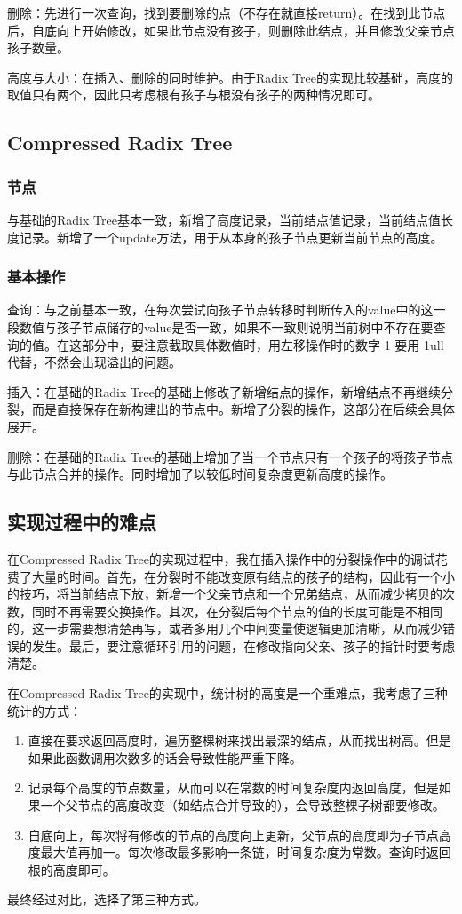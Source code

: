 \documentclass[fontset=windows]{article}
\begin{document}
删除：先进行一次查询，找到要删除的点（不存在就直接return）。在找到此节点后，自底向上开始修改，如果此节点没有孩子，则删除此结点，并且修改父亲节点孩子数量。

高度与大小：在插入、删除的同时维护。由于Radix Tree的实现比较基础，高度的取值只有两个，因此只考虑根有孩子与根没有孩子的两种情况即可。

\subsection{Compressed Radix Tree}

\subsubsection{节点}
与基础的Radix Tree基本一致，新增了高度记录，当前结点值记录，当前结点值长度记录。新增了一个update方法，用于从本身的孩子节点更新当前节点的高度。

\subsubsection{基本操作}
查询：与之前基本一致，在每次尝试向孩子节点转移时判断传入的value中的这一段数值与孩子节点储存的value是否一致，如果不一致则说明当前树中不存在要查询的值。在这部分中，要注意截取具体数值时，用左移操作时的数字 1 要用 1ull 代替，不然会出现溢出的问题。

插入：在基础的Radix Tree的基础上修改了新增结点的操作，新增结点不再继续分裂，而是直接保存在新构建出的节点中。新增了分裂的操作，这部分在后续会具体展开。

删除：在基础的Radix Tree的基础上增加了当一个节点只有一个孩子的将孩子节点与此节点合并的操作。同时增加了以较低时间复杂度更新高度的操作。

\subsection{实现过程中的难点}
在Compressed Radix Tree的实现过程中，我在插入操作中的分裂操作中的调试花费了大量的时间。首先，在分裂时不能改变原有结点的孩子的结构，因此有一个小的技巧，将当前结点下放，新增一个父亲节点和一个兄弟结点，从而减少拷贝的次数，同时不再需要交换操作。其次，在分裂后每个节点的值的长度可能是不相同的，这一步需要想清楚再写，或者多用几个中间变量使逻辑更加清晰，从而减少错误的发生。最后，要注意循环引用的问题，在修改指向父亲、孩子的指针时要考虑清楚。

在Compressed Radix Tree的实现中，统计树的高度是一个重难点，我考虑了三种统计的方式：
\begin{enumerate}
  \item 直接在要求返回高度时，遍历整棵树来找出最深的结点，从而找出树高。但是如果此函数调用次数多的话会导致性能严重下降。
  \item 记录每个高度的节点数量，从而可以在常数的时间复杂度内返回高度，但是如果一个父节点的高度改变（如结点合并导致的），会导致整棵子树都要修改。
  \item 自底向上，每次将有修改的节点的高度向上更新，父节点的高度即为子节点高度最大值再加一。每次修改最多影响一条链，时间复杂度为常数。查询时返回根的高度即可。
\end{enumerate}
最终经过对比，选择了第三种方式。
\end{document}
